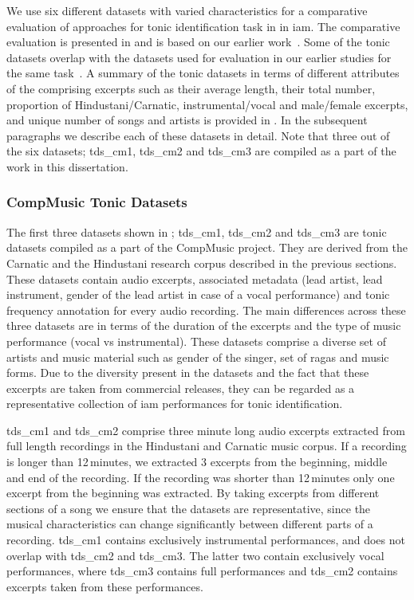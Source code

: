 {We use six different datasets with varied characteristics for a comparative evaluation of approaches for tonic identification task in in \gls{iam}. The comparative evaluation is presented in  and is based on our earlier work~\citep{Gulati2014Tonic}. Some of the tonic datasets overlap with the datasets used for evaluation in our earlier studies for the same task~\citep{salamon2012multipitch,gulati2012two}. A summary of the tonic datasets in terms of different attributes of the comprising excerpts such as their average length, their total number, proportion of Hindustani/Carnatic, instrumental/vocal and male/female excerpts, and unique number of songs and artists is provided in . In the subsequent paragraphs we describe each of these datasets in detail. Note that three out of the six datasets; \acrshort{tds_cm1}, \acrshort{tds_cm2} and \acrshort{tds_cm3} are compiled as a part of the work in this dissertation. 


\subsubsection{CompMusic Tonic Datasets}
\label{sec:corpus_compmusic_tonic_dataset}

The first three datasets shown in ; \acrshort{tds_cm1}, \acrshort{tds_cm2} and \acrshort{tds_cm3} are tonic datasets compiled as a part of the CompMusic project. They are derived from the Carnatic and the Hindustani research corpus described in the previous sections. These datasets contain audio excerpts, associated metadata (lead artist, lead instrument, gender of the lead artist in case of a vocal performance) and tonic frequency annotation for every audio recording. The main differences across these three datasets are in terms of the duration of the excerpts and the type of music performance (vocal vs instrumental). These datasets comprise a diverse set of artists and music material such as gender of the singer, set of \glspl{raga} and music forms. Due to the diversity present in the datasets and the fact that these excerpts are taken from commercial releases, they can be regarded as a representative collection of \gls{iam} performances for tonic identification.  

\acrshort{tds_cm1} and \acrshort{tds_cm2} comprise three minute long audio excerpts extracted from full length recordings in the Hindustani and Carnatic music corpus. If a recording is longer than 12\,minutes, we extracted 3 excerpts from the beginning, middle and end of the recording. If the recording was shorter than 12\,minutes only one excerpt from the beginning was extracted. By taking excerpts from different sections of a song we ensure that the datasets are representative, since the musical characteristics can change significantly between different parts of a recording. \acrshort{tds_cm1} contains exclusively instrumental performances, and does not overlap with \acrshort{tds_cm2} and \acrshort{tds_cm3}. The latter two contain exclusively vocal performances, where \acrshort{tds_cm3} contains full performances and \acrshort{tds_cm2} contains excerpts taken from these performances. 

}
